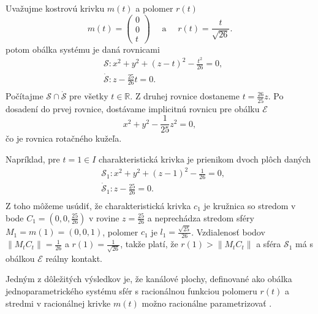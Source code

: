 \begin{example}
Uvažujme kostrovú krivku $m(t)$ a polomer $r(t)$
$$ 
m(t) = \begin{pmatrix} 0 \\ 0 \\ t \end{pmatrix} \quad \text{ a } \quad r(t) = \frac{t}{\sqrt{26}}.
$$
potom obálka systému je daná rovnicami
\begin{align*}
&\mathcal{S} \colon x^2 + y^2 + (z - t)^2 - \frac{t^2}{26} = 0, \\
&\mathcal{\dot{S}} \colon z - \frac{25}{26}t = 0. \\
\end{align*}
Počítajme $ \mathcal{S} \cap \mathcal{\dot{S}} $ pre všetky $t \in \mathbb{R}.$ Z druhej rovnice dostaneme $t = \frac{26}{25}z$. Po dosadení do prvej rovnice, dostávame implicitnú rovnicu pre obálku $\mathcal{E}$
$$
x^2 + y^2 - \frac{1}{25}z^2 = 0,
$$
čo je rovnica rotačného kužeľa.

Napríklad, pre $t = 1 \in I$ charakteristická krivka je prienikom dvoch plôch daných
\begin{align*}
&\mathcal{S}_1 \colon x^2 + y^2 + (z - 1)^2 - \frac{1}{26} = 0, \\
&\mathcal{\dot{S}}_1 \colon z - \frac{25}{26} = 0. \\
\end{align*}
Z toho môžeme usúdiť, že charakteristická krivka $c_1$ je kružnica so stredom v bode $C_1 = (0, 0, \frac{25}{26})$ v rovine $z = \frac{25}{26}$ a neprechádza stredom sféry $M_1 = m(1) = (0,0,1)$, polomer $c_1$ je $l_{1} = \frac{\sqrt{25}}{26}$. Vzdialenosť bodov $ \|M_tC_t\| = \frac{1}{26}$ a $r(1)= \frac{1}{\sqrt{26}}$, takže platí, že $r(1) > \|M_tC_t\|$ a sféra $\mathcal{S}_1$ má s obálkou $\mathcal{E}$ reálny kontakt.
\end{example}

Jedným z dôležitých výsledkov je, že kanálové plochy, definované ako obálka jednoparametrického systému sfér s racionálnou funkciou polomeru $r(t)$ a stredmi v racionálnej krivke $m(t)$ možno racionálne parametrizovať \cite{Pet97}.


